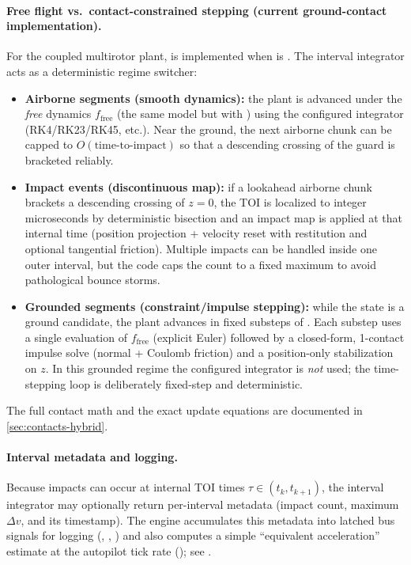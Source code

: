 \paragraph{Free flight vs.\ contact-constrained stepping (current ground-contact implementation).}
For the coupled multirotor plant,  is implemented when  is . The interval integrator acts as a deterministic regime switcher:
\begin{itemize}[leftmargin=*,itemsep=2pt]
  \item \textbf{Airborne segments (smooth dynamics):} the plant is advanced under the \emph{free} dynamics \(f_{\mathrm{free}}\) (the same model but with ) using the configured integrator (RK4/RK23/RK45, etc.). Near the ground, the next airborne chunk can be capped to \(O(\text{time-to-impact})\) so that a descending crossing of the guard is bracketed reliably.
  \item \textbf{Impact events (discontinuous map):} if a lookahead airborne chunk brackets a descending crossing of \(z=0\), the TOI is localized to integer microseconds by deterministic bisection and an impact map is applied at that internal time (position projection + velocity reset with restitution and optional tangential friction). Multiple impacts can be handled inside one outer interval, but the code caps the count to a fixed maximum to avoid pathological bounce storms.
  \item \textbf{Grounded segments (constraint/impulse stepping):} while the state is a ground candidate, the plant advances in fixed substeps of . Each substep uses a single evaluation of \(f_{\mathrm{free}}\) (explicit Euler) followed by a closed-form, 1-contact impulse solve (normal + Coulomb friction) and a position-only stabilization on \(z\). In this grounded regime the configured integrator is \emph{not} used; the time-stepping loop is deliberately fixed-step and deterministic.
\end{itemize}
The full contact math and the exact update equations are documented in \cref{sec:contacts-hybrid}.

\paragraph{Interval metadata and logging.}
Because impacts can occur at internal TOI times \(\tau\in(t_k,t_{k+1})\), the interval integrator may optionally return per-interval metadata (impact count, maximum \(\Delta v\), and its timestamp). The engine accumulates this metadata into latched bus signals for logging (, , ) and also computes a simple ``equivalent acceleration'' estimate at the autopilot tick rate (); see .

